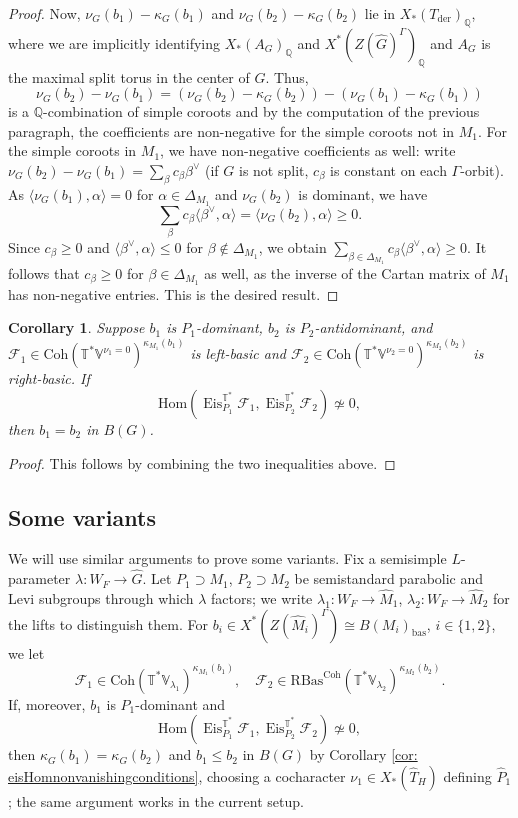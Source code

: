 \documentclass{amsart}
\newtheorem{corollary}[theorem]{Corollary}
\theoremstyle{definition}
\theoremstyle{remark}
\numberwithin{equation}{section}
\newcommand{\der}{\mathrm{der}}
\newcommand{\mc}{\mathcal}
\newcommand{\Q}{\mathbb{Q}}
\newcommand{\bas}{\mathrm{bas}}
\newcommand{\Hom}{\mathrm{Hom}}
\newcommand{\wh}{\widehat}
\DeclareMathOperator{\Eis}{\mathrm{Eis}}
\newcommand{\Coh}{\mathrm{Coh}}
\newcommand{\V}{\mathbb{V}}
\newcommand{\T}{\mathbb{T}}
\newcommand{\RBas}{\mathrm{RBas}}
\begin{document}
\begin{proof}
Now, $\nu_G(b_1) -\kappa_G(b_1)$ and $\nu_G(b_2)  - \kappa_G(b_2)$ lie in $X_{\ast}(T_{\der})_{\Q}$, where we are implicitly identifying $X_{\ast}(A_G)_{\Q}$ and $X^{\ast}(Z(\wh{G})^{\Gamma})_{\Q}$ and $A_G$ is the maximal split torus in the center of $G$. Thus,
\begin{equation*}
    \nu_G(b_2) - \nu_G(b_1) = (\nu_G(b_2) - \kappa_G(b_2)) - (\nu_G(b_1) - \kappa_G(b_1))
\end{equation*}
is a $\Q$-combination of simple coroots and by the computation of the previous paragraph, the coefficients are non-negative for the simple coroots not in $M_1$. For the simple coroots in $M_1$, we have non-negative coefficients as well: write $\nu_G(b_2) - \nu_G(b_1)=\sum_\beta c_\beta \beta^\vee$ (if $G$ is not split, $c_\beta$ is constant on each $\Gamma$-orbit). As $\langle \nu_G(b_1),\alpha\rangle=0$ for $\alpha\in \Delta_{M_1}$ and $\nu_G(b_2)$ is dominant, we have
\[
\sum_{\beta}c_\beta \langle \beta^\vee, \alpha\rangle=
\langle \nu_{G}(b_2), \alpha \rangle \geq 0. 
\]
Since $c_{\beta}\geq 0$ and $\langle \beta^\vee, \alpha\rangle \leq 0$ for $\beta \not\in \Delta_{M_1}$, we obtain $\sum_{\beta\in \Delta_{M_1}}c_\beta \langle \beta^\vee, \alpha\rangle\geq 0$. It follows that $c_\beta \geq 0$ for $\beta\in \Delta_{M_1}$ as well, as the inverse of the Cartan matrix of $M_1$ has non-negative entries. This is the desired result. 
\end{proof}

\begin{corollary}
Suppose $b_1$ is $P_1$-dominant, $b_2$ is $P_2$-antidominant, and  $\mc F_1 \in \Coh(\T^{\ast}\V^{\nu_1 = 0})^{\kappa_{M_1}(b_1)}$ is left-basic and $\mc{F}_2 \in \Coh(\T^{\ast}\V^{\nu_2 = 0})^{\kappa_{M_2}(b_2)}$ is right-basic. If 
\[
\Hom (\Eis^{\T^{\ast}}_{P_1} \mc F_1, \Eis^{\T^{\ast}}_{P_2} \mc F_2)\not\simeq 0, 
\]
then $b_1=b_2$ in $B(G)$.
\end{corollary}

\begin{proof}
This follows by combining the two inequalities above.  
\end{proof}

\subsection{Some variants}
We will use similar arguments to prove some variants. Fix a semisimple $L$-parameter $\lambda\colon W_F\to \wh G$. Let $P_1\supset M_1$, $P_2\supset M_2$ be semistandard parabolic and Levi subgroups through which  $\lambda$ factors; we write $\lambda_1\colon W_F\to \wh M_1$, $\lambda_2\colon W_F\to \wh M_2$ for the lifts to distinguish them. For $b_i\in X^*(Z(\wh M_i)^\Gamma)\cong B(M_i)_{\bas}$, $i \in \{1,2\}$, we let
\[
\mc F_1\in \Coh(\T^*\V_{\lambda_1})^{\kappa_{M_1}(b_1)}, \quad \mc F_2\in \RBas^\Coh(\T^*\V_{\lambda_2})^{\kappa_{M_2}(b_2)}.
\]
If, moreover, $b_1$ is $P_1$-dominant and
\[
\Hom(\Eis^{\T^*}_{P_1}\mc F_1, \Eis^{\T^*}_{P_2}\mc F_2)\not\simeq 0, 
\]
then $\kappa_G(b_1)=\kappa_G(b_2)$ and $b_1\leq b_2$ in $B(G)$ by Corollary \ref{cor: eisHomnonvanishingconditions}, choosing a cocharacter $\nu_1\in X_*(\wh T_H)$ defining $\wh P_1$; the same argument works in the current setup.
\end{document}
